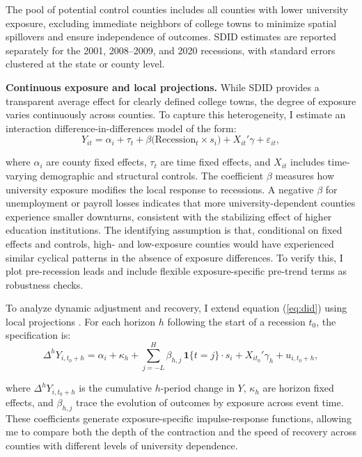 The pool of potential control counties includes all counties with lower university exposure, excluding immediate neighbors of college towns to minimize spatial spillovers and ensure independence of outcomes. SDID estimates are reported separately for the 2001, 2008–2009, and 2020 recessions, with standard errors clustered at the state or county level.

\noindent \textbf{Continuous exposure and local projections.} While SDID provides a transparent average effect for clearly defined college towns, the degree of exposure varies continuously across counties. To capture this heterogeneity, I estimate an interaction difference-in-differences model of the form:
\begin{equation}
	\label{eq:did}
	Y_{it} = \alpha_i + \tau_t + \beta \big(\text{Recession}_t \times s_i\big) + X_{it}'\gamma + \varepsilon_{it},
\end{equation}

where $\alpha_i$ are county fixed effects, $\tau_t$ are time fixed effects, and $X_{it}$ includes time-varying demographic and structural controls. The coefficient $\beta$ measures how university exposure modifies the local response to recessions. A negative $\beta$ for unemployment or payroll losses indicates that more university-dependent counties experience smaller downturns, consistent with the stabilizing effect of higher education institutions. The identifying assumption is that, conditional on fixed effects and controls, high- and low-exposure counties would have experienced similar cyclical patterns in the absence of exposure differences. To verify this, I plot pre-recession leads and include flexible exposure-specific pre-trend terms as robustness checks.

To analyze dynamic adjustment and recovery, I extend equation (\ref{eq:did}) using local projections \citep{Jorda2005LP}. For each horizon $h$ following the start of a recession $t_0$, the specification is:
\begin{equation}
	\label{eq:lp}
	\Delta^h Y_{i,t_0+h} = \alpha_i + \kappa_h + \sum_{j=-L}^{H}\beta_{h,j}\,\mathbf{1}\{t=j\}\cdot s_i + X_{it_0}'\gamma_h + u_{i,t_0+h},
\end{equation}

where $\Delta^h Y_{i,t_0+h}$ is the cumulative $h$-period change in $Y$, $\kappa_h$ are horizon fixed effects, and $\beta_{h,j}$ trace the evolution of outcomes by exposure across event time. These coefficients generate exposure-specific impulse-response functions, allowing me to compare both the depth of the contraction and the speed of recovery across counties with different levels of university dependence.

